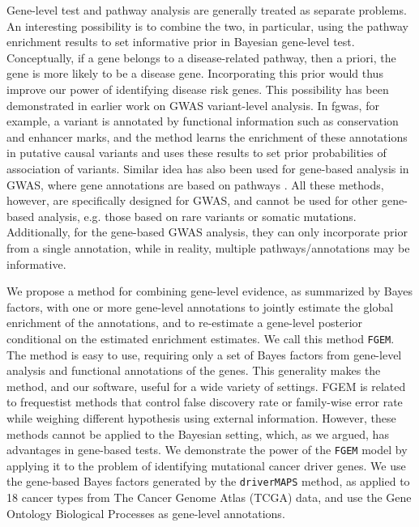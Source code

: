 Gene-level test and pathway analysis are generally treated as separate problems. An interesting possibility is to combine the two, in particular, using the pathway enrichment results to set informative prior in Bayesian gene-level test. Conceptually, if a gene belongs to a disease-related pathway, then a priori, the gene is more likely to be a disease gene. Incorporating this prior would thus improve our power of identifying disease risk genes. This possibility has been demonstrated in earlier work on GWAS variant-level analysis. In fgwas, for example, a variant is annotated by functional information such as conservation and enhancer marks, and the method learns the enrichment of these annotations in putative causal variants and uses these results to set prior probabilities of association of variants. Similar idea has also been used for gene-based analysis in GWAS, where gene annotations are based on pathways \cite{Carbonetto_2013}. All these methods, however, are specifically designed for GWAS, and cannot be used for other gene-based analysis, e.g. those based on rare variants or somatic mutations. Additionally, for the gene-based GWAS analysis, they can only incorporate prior from a single annotation, while in reality, multiple pathways/annotations may be informative.  

We propose a method for combining gene-level evidence, as summarized by Bayes factors, with one or more gene-level annotations to jointly estimate the global enrichment of the annotations, and to re-estimate a gene-level posterior conditional on the estimated enrichment estimates. We call this method \texttt{FGEM}. The method is easy to use, requiring only a set of Bayes factors from gene-level analysis and functional annotations of the genes. This generality makes the method, and our software, useful for a wide variety of settings.    
FGEM is related to frequestist methods that control false discovery rate or family-wise error rate while weighing different hypothesis using external information. However, these methods cannot be applied to the Bayesian setting, which, as we argued, has advantages in gene-based tests. 
We demonstrate the power of the \texttt{FGEM} model by applying it to the problem of
identifying mutational cancer driver genes. We use the gene-based Bayes factors generated by the \texttt{driverMAPS} method, as applied to 18 cancer types from The Cancer Genome Atlas
(TCGA) data\cite{TCGA}\cite{drivermaps}, and use the Gene Ontology Biological Processes as gene-level annotations.

